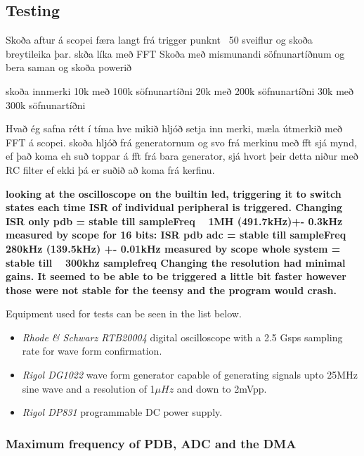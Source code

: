 \subsection{Testing}



Skoða aftur á scopei færa langt frá trigger punknt ~50 sveiflur og skoða breytileika þar.
skða líka með FFT
Skoða með mismunandi söfnunartíðnum og bera saman og skoða powerið

skoða innmerki  10k með 100k söfnunartíðni
                20k með 200k söfnunartíðni
                30k með 300k söfnunartíðni

Hvað ég safna rétt í tíma
hve mikið hljóð
setja inn merki, mæla útmerkið með FFT á scopei.
skoða hljóð frá generatornum og svo frá merkinu með fft
sjá mynd, ef það koma eh suð toppar á fft frá bara generator, sjá hvort þeir detta niður með RC filter ef ekki þá er suðið að koma frá kerfinu.



\textbf{looking at the oscilloscope on the builtin led, triggering it to switch states each time ISR of individual peripheral is triggered. 
Changing ISR only pdb = stable till sampleFreq  ~ 1MH  (491.7kHz)+- 0.3kHz measured by scope
for 16 bits:
ISR pdb adc = stable till sampleFreq ~ 280kHz   (139.5kHz) +- 0.01kHz measured by scope
whole system = stable till ~ 300khz samplefreq 
Changing the resolution had minimal gains.
It seemed to be able to be triggered a little bit faster however those were not stable for the teensy and the program would crash.}


Equipment used for tests can be seen in the list below.
\begin{itemize}
    \item \textit{Rhode \& Schwarz RTB20004} digital oscilloscope with a 2.5 Gsps sampling rate for wave form confirmation.
    \item \textit{Rigol DG1022} wave form generator capable of generating signals upto 25MHz sine wave and a resolution of 1$\mu Hz$ and down to 2mVpp.
    \item \textit{Rigol DP831} programmable DC power supply.
\end{itemize}



\subsubsection{Maximum frequency of PDB, ADC and the DMA}

